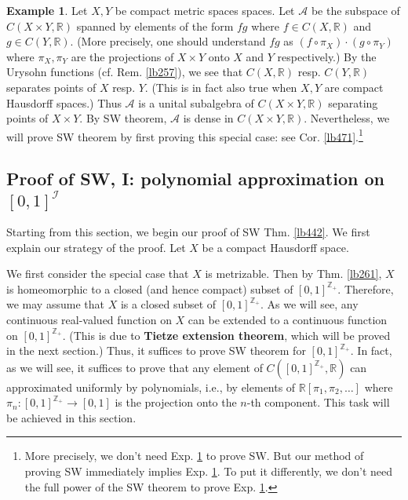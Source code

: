 \documentclass[12pt,b5paper,notitlepage]{article}
\theoremstyle{definition}
\newtheorem{eg}[df]{Example}
\theoremstyle{plain}
\newcommand{\scr}{\mathscr}
\newcommand{\Zbb}{\mathbb Z}
\newcommand{\Rbb}{\mathbb R}
\numberwithin{equation}{section}
\begin{document}
\begin{eg}\label{lb539}
Let $X,Y$ be compact metric spaces spaces. Let $\scr A$ be the subspace of $C(X\times Y,\Rbb)$ spanned by elements of the form $fg$ where $f\in C(X,\Rbb)$ and $g\in C(Y,\Rbb)$. (More precisely, one should understand $fg$ as $(f\circ\pi_X)\cdot(g\circ\pi_Y)$ where $\pi_X,\pi_Y$ are the projections of $X\times Y$ onto $X$ and $Y$ respectively.) By the Urysohn functions (cf. Rem. \ref{lb257}), we see that $C(X,\Rbb)$ resp. $C(Y,\Rbb)$ separates points of $X$ resp. $Y$. (This is in fact also true when $X,Y$ are compact Hausdorff spaces.) Thus $\scr A$ is a unital subalgebra of $C(X\times Y,\Rbb)$ separating points of $X\times Y$. By SW theorem, $\scr A$ is dense in $C(X\times Y,\Rbb)$. Nevertheless, we will prove SW theorem by first proving this special case: see Cor. \ref{lb471}.\footnote{More precisely, we don't need Exp. \ref{lb539} to prove SW. But our method of proving SW immediately implies Exp. \ref{lb539}. To put it differently, we don't need the full power of the SW theorem to prove Exp. \ref{lb539}.}
\end{eg}




\subsection{Proof of SW, I: polynomial approximation on $[0,1]^{\scr I}$}



Starting from this section, we begin our proof of SW Thm. \ref{lb442}. We first explain our strategy of the proof. Let $X$ be a compact Hausdorff space. 

We first consider the special case that $X$ is metrizable. Then by Thm. \ref{lb261}, $X$ is homeomorphic to a closed (and hence compact) subset of $[0,1]^{\Zbb_+}$. Therefore, we may assume that $X$ is a closed subset of $[0,1]^{\Zbb_+}$. As we will see, any continuous real-valued function on $X$ can be extended to a continuous function on  $[0,1]^{\Zbb_+}$. (This is due to \textbf{Tietze extension theorem}, which will be proved in the next section.) Thus, it suffices to prove SW theorem for $[0,1]^{\Zbb_+}$. In fact, as we will see, it suffices to prove that any element of $C([0,1]^{\Zbb_+},\Rbb)$ can approximated uniformly by polynomials, i.e., by elements of $\Rbb[\pi_1,\pi_2,\dots]$ where $\pi_n:[0,1]^{\Zbb_+}\rightarrow[0,1]$ is the projection onto the $n$-th component. This task will be achieved in this section.
\end{document}
